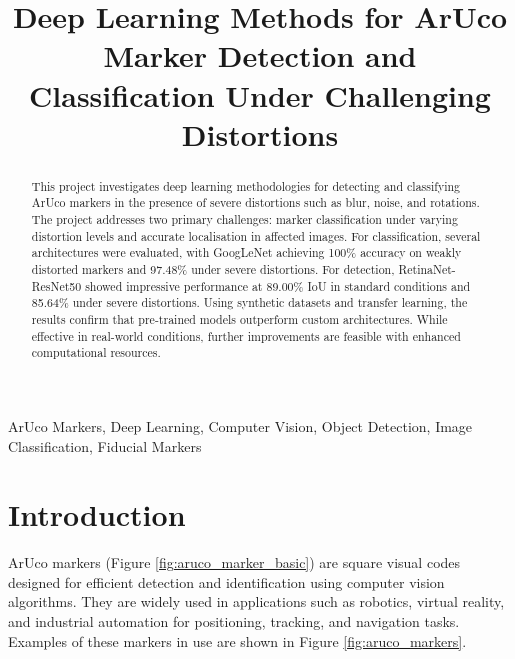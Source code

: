 \documentclass[conference]{IEEEtran}
\begin{document}
\title{Deep Learning Methods for ArUco Marker Detection and Classification Under Challenging Distortions}

\author{
}

\maketitle
\begin{abstract}

This project investigates deep learning methodologies for detecting and classifying ArUco markers in the presence of severe distortions such as blur,
noise, and rotations. The project addresses two primary challenges: marker classification under varying distortion levels and accurate localisation in
affected images. For classification, several architectures were evaluated, with GoogLeNet achieving 100\% accuracy on weakly distorted markers and
97.48\% under severe distortions. For detection, RetinaNet-ResNet50 showed impressive performance at 89.00\% IoU in standard conditions and 85.64\%
under severe distortions. Using synthetic datasets and transfer learning, the results confirm that pre-trained models outperform custom architectures.
While effective in real-world conditions, further improvements are feasible with enhanced computational resources.

\end{abstract}

\begin{IEEEkeywords}
ArUco Markers, Deep Learning, Computer Vision, Object Detection, Image Classification, Fiducial Markers
\end{IEEEkeywords}

\section{Introduction}

ArUco markers (Figure \ref{fig:aruco_marker_basic}) are square visual codes designed for efficient detection and identification
using computer vision algorithms. They are widely used in applications such as robotics, virtual reality, and industrial automation
for positioning, tracking, and navigation tasks. Examples of these markers in use are shown in Figure \ref{fig:aruco_markers}.
\end{document}

